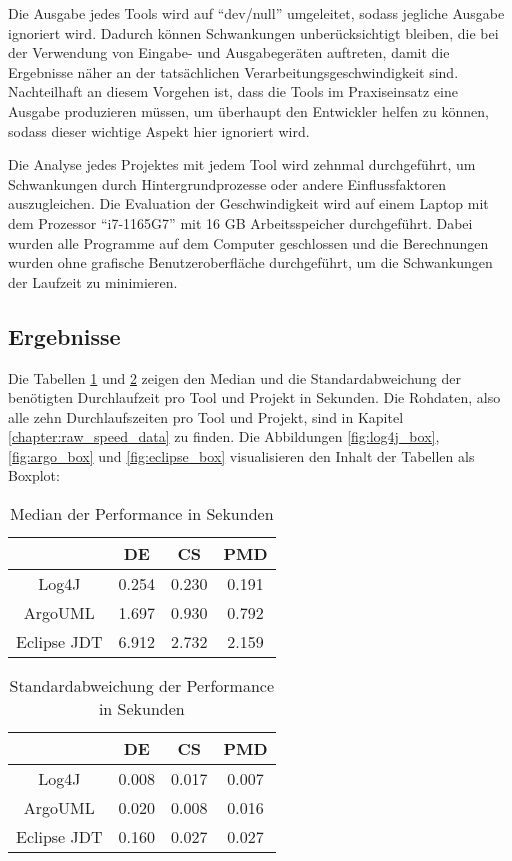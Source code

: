  Die Ausgabe jedes Tools wird auf \enquote{dev/null} umgeleitet, sodass jegliche Ausgabe ignoriert wird. Dadurch können Schwankungen unberücksichtigt bleiben, die bei der Verwendung von Eingabe- und Ausgabegeräten auftreten, damit die Ergebnisse näher an der tatsächlichen Verarbeitungsgeschwindigkeit sind.  Nachteilhaft an diesem Vorgehen ist, dass die Tools im Praxiseinsatz eine Ausgabe produzieren müssen, um überhaupt den Entwickler helfen zu können, sodass dieser wichtige Aspekt hier ignoriert wird. 
 
 Die Analyse jedes Projektes mit jedem Tool wird zehnmal durchgeführt, um Schwankungen durch Hintergrundprozesse oder andere Einflussfaktoren auszugleichen. Die Evaluation der Geschwindigkeit wird auf einem Laptop mit dem Prozessor \enquote{i7-1165G7} mit 16 GB Arbeitsspeicher durchgeführt. Dabei wurden alle Programme auf dem Computer geschlossen und die Berechnungen wurden ohne grafische Benutzeroberfläche durchgeführt, um die Schwankungen der Laufzeit zu minimieren.  
 \subsection{Ergebnisse}
 Die Tabellen \ref{tab:median_speed} und \ref{tab:std_speed} zeigen den Median und die Standardabweichung der benötigten Durchlaufzeit pro Tool und Projekt in Sekunden. Die Rohdaten, also alle zehn Durchlaufszeiten pro Tool und Projekt, sind in Kapitel \ref{chapter:raw_speed_data} zu finden. Die Abbildungen \ref{fig:log4j_box}, \ref{fig:argo_box} und \ref{fig:eclipse_box} visualisieren den Inhalt der Tabellen als Boxplot: 
 \begin{table}[]
     \centering
     \begin{tabular}{c|c|c|c}
        & DE & CS & PMD  \\\hline
        Log4J & 0.254 & 0.230 & 0.191\\\hline 
        ArgoUML & 1.697 & 0.930 & 0.792 \\\hline
        Eclipse JDT & 6.912 & 2.732 & 2.159
     \end{tabular}
     \caption{Median der Performance in Sekunden}
     \label{tab:median_speed}
 \end{table}
 
  \begin{table}[]
     \centering
     \begin{tabular}{c|c|c|c}
        & DE & CS & PMD  \\\hline
        Log4J & 0.008 & 0.017 & 0.007\\\hline 
        ArgoUML & 0.020 & 0.008 & 0.016 \\\hline
        Eclipse JDT & 0.160 & 0.027 & 0.027
     \end{tabular}
     \caption{Standardabweichung der Performance in Sekunden}
     \label{tab:std_speed}
 \end{table}
 
